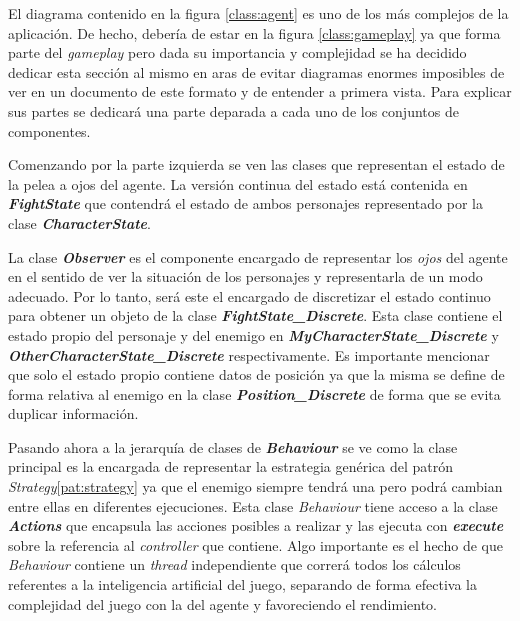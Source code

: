 El diagrama contenido en la figura \ref{class:agent} es uno de los más complejos de la aplicación. De hecho, debería de estar en la figura \ref{class:gameplay} ya que forma parte del \textit{gameplay} pero dada su importancia y complejidad se ha decidido dedicar esta sección al mismo en aras de evitar diagramas enormes imposibles de ver en un documento de este formato y de entender a primera vista. Para explicar sus partes se dedicará una parte deparada a cada uno de los conjuntos de componentes.

\bigskip

Comenzando por la parte izquierda se ven las clases que representan el estado de la pelea a ojos del agente. La versión continua del estado está contenida en \textbf{\textit{FightState}} que contendrá el estado de ambos personajes representado por la clase \textbf{\textit{CharacterState}}.

\bigskip
La clase \textbf{\textit{Observer}} es el componente encargado de representar los \textit{ojos} del agente en el sentido de ver la situación de los personajes y representarla de un modo adecuado. Por lo tanto, será este el encargado de discretizar el estado continuo para obtener un objeto de la clase \textbf{\textit{FightState\_Discrete}}. Esta clase contiene el estado propio del personaje y del enemigo en \textbf{\textit{MyCharacterState\_Discrete}} y \textbf{\textit{OtherCharacterState\_Discrete}} respectivamente. Es importante mencionar que solo el estado propio contiene datos de posición ya que la misma se define de forma relativa al enemigo en la clase \textbf{\textit{Position\_Discrete}} de forma que se evita duplicar información.

\bigskip

Pasando ahora a la jerarquía de clases de \textbf{\textit{Behaviour}} se ve como la clase principal es la encargada de representar la estrategia genérica del patrón \textit{Strategy}\ref{pat:strategy} ya que el enemigo siempre tendrá una pero podrá cambian entre ellas en diferentes ejecuciones. Esta clase \textit{Behaviour} tiene acceso a la clase \textbf{\textit{Actions}} que encapsula las acciones posibles a realizar y las ejecuta con \textbf{\textit{execute}} sobre la referencia al \textit{controller} que contiene. Algo importante es el hecho de que \textit{Behaviour} contiene un \textit{thread} independiente que correrá todos los cálculos referentes a la inteligencia artificial del juego, separando de forma efectiva la complejidad del juego con la del agente y favoreciendo el rendimiento.

